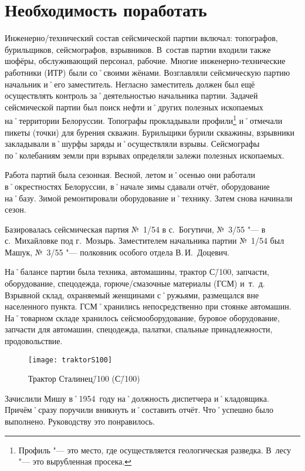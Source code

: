﻿\chapter{Необходимость поработать}

Инженерно\-/технический состав сейсмической партии включал: топографов, бурильщиков, сейсмографов, взрывников. В~состав партии входили также шофёры, обслуживающий персонал, рабочие. Многие инженерно-технические работники (ИТР) были со˚своими жёнами. Возглавляли сейсмическую партию начальник и˚его заместитель. Негласно заместитель должен был ещё осуществлять контроль за˚деятельностью начальника партии. Задачей сейсмической партии был поиск нефти и˚других полезных ископаемых на˚территории Белоруссии. Топографы прокладывали профили\footnote{Профиль "--- это место, где осуществляется геологическая разведка. В~лесу "--- это вырубленная просека.}  и˚отмечали пикеты (точки) для бурения скважин. Бурильщики бурили скважины, взрывники закладывали в˚шурфы заряды и˚осуществляли взрывы. Сейсмографы по˚колебаниям земли при взрывах определяли залежи полезных ископаемых.

Работа партий была сезонная. Весной, летом и˚осенью они работали в˚окрестностях Белоруссии, в˚начале зимы сдавали отчёт, оборудование на˚базу. Зимой ремонтировали оборудование и˚технику. Затем снова начинали сезон.

Базировалась сейсмическая партия №~1/54 в с.~Богутичи, №~3/55 "--- в с.~Михайловке под г.~Мозырь. Заместителем начальника партии №~1/54 был Машук, №~3/55 "--- полковник особого отдела В.\,И.~Доцевич.

На˚балансе партии была техника, автомашины, трактор С\=/100, запчасти, оборудование, спецодежда, горюче\-/смазочные материалы (ГСМ) и~т.~д. Взрывной склад, охраняемый женщинами с˚ружьями, размещался вне населенного пункта. ГСМ˚хранились непосредственно при стоянке автомашин. На˚товарном складе хранилось сейсмооборудование, буровое оборудование, запчасти для автомашин, спецодежда, палатки, спальные принадлежности, продовольствие.

\begin{wrapfigure}{O}{.4\textwidth}
\centering
\texttt{[image: traktorS100]}
\caption[Трактор Сталинец\=/100 (С\=/100)]{Трактор Сталинец\=/100 (С\=/100)\footnotemark}
\label{fig:traktorS100}
\end{wrapfigure}

Зачислили Мишу в˚1954~году на˚должность диспетчера и˚кладовщика. Причём˚сразу поручили вникнуть и˚составить отчёт. Что˚успешно было выполнено. Руководству это понравилось.

